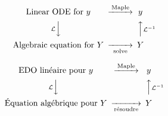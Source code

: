 \documentclass[12pt]{report}
\begin{document}

\[
\begin{CD}
\text{Linear ODE for $y$} @>\text{Maple}>> y \\
@V{\mathcal{L}}VV    @AA{\mathcal{L}^{-1}}A \\
\text{Algebraic equation for $Y$} @>>{\text{solve}}> Y
\end{CD}
\]

\[
\begin{CD}
\text{EDO linéaire pour $y$} @>\text{Maple}>> y \\
@V{\mathcal{L}}VV    @AA{\mathcal{L}^{-1}}A \\
\text{Équation algébrique pour $Y$} @>>{\text{résoudre}}> Y
\end{CD}
\]
\end{document}
